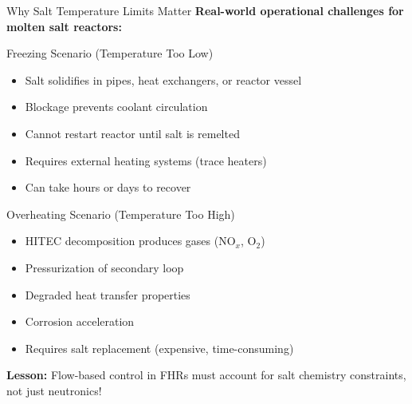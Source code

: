 \documentclass[aspectratio=169]{beamer}
\begin{document}
\begin{frame}[allowframebreaks]{Why Salt Temperature Limits Matter}
    \textbf{Real-world operational challenges for molten salt reactors:}

    \vspace{1em}
    \begin{block}{Freezing Scenario (Temperature Too Low)}
        \begin{itemize}
            \item Salt solidifies in pipes, heat exchangers, or reactor vessel
            \item Blockage prevents coolant circulation
            \item Cannot restart reactor until salt is remelted
            \item Requires external heating systems (trace heaters)
            \item Can take hours or days to recover
        \end{itemize}
    \end{block}

    \vspace{1em}
    \begin{block}{Overheating Scenario (Temperature Too High)}
        \begin{itemize}
            \item HITEC decomposition produces gases (NO$_x$, O$_2$)
            \item Pressurization of secondary loop
            \item Degraded heat transfer properties
            \item Corrosion acceleration
            \item Requires salt replacement (expensive, time-consuming)
        \end{itemize}
    \end{block}

    \vspace{1em}
    \textbf{Lesson:} Flow-based control in FHRs must account for salt chemistry constraints, not just neutronics!
\end{frame}
\end{document}
